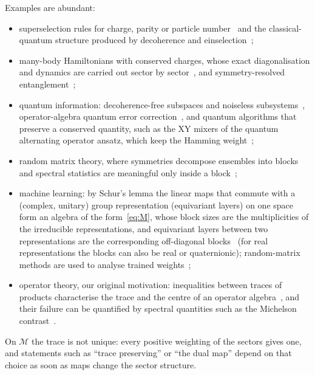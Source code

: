 \documentclass[11pt]{article}
\newcommand{\M}{\mathcal{M}}
\begin{document}
Examples are abundant:
\begin{itemize}\itemsep0pt
\item superselection rules for charge, parity or particle number~\cite{wick1952,bartlett2007} and the
classical-quantum structure produced by decoherence and einselection~\cite{zurek2003};
\item many-body Hamiltonians with conserved charges, whose exact diagonalisation and dynamics are carried out
sector by sector~\cite{sandvik2010,weinberg2017}, and symmetry-resolved entanglement~\cite{goldstein2018,xavier2018};
\item quantum information: decoherence-free subspaces and noiseless subsystems~\cite{zanardi1997,knill2000},
operator-algebra quantum error correction~\cite{beny2007}, and quantum algorithms that preserve a conserved
quantity, such as the XY mixers of the quantum alternating operator ansatz, which keep the Hamming
weight~\cite{hadfield2019};
\item random matrix theory, where symmetries decompose ensembles into blocks and spectral statistics are
meaningful only inside a block~\cite{dyson1962,mehta2004};
\item machine learning: by Schur's lemma the linear maps that commute with a (complex, unitary) group representation (equivariant
layers) on one space form an algebra of the form~\eqref{eq:M}, whose block sizes are the multiplicities of the
irreducible representations, and equivariant layers between two representations are the corresponding off-diagonal
blocks~\cite{cohen2016,finzi2021} (for real representations the blocks can also be real or quaternionic); random-matrix methods are used to analyse trained
weights~\cite{martin2021};
\item operator theory, our original motivation: inequalities between traces of products characterise the trace
and the centre of an operator algebra~\cite{gardner1979,petz1988,novikov2015,virosztek2017}, and their
failure can be quantified by spectral quantities such as the Michelson contrast~\cite{abed2024,novikov2020}.
\end{itemize}
On $\M$ the trace is not unique: every positive weighting of the sectors gives one, and statements such as
``trace preserving'' or ``the dual map'' depend on that choice as soon as maps change the sector structure.
\end{document}
